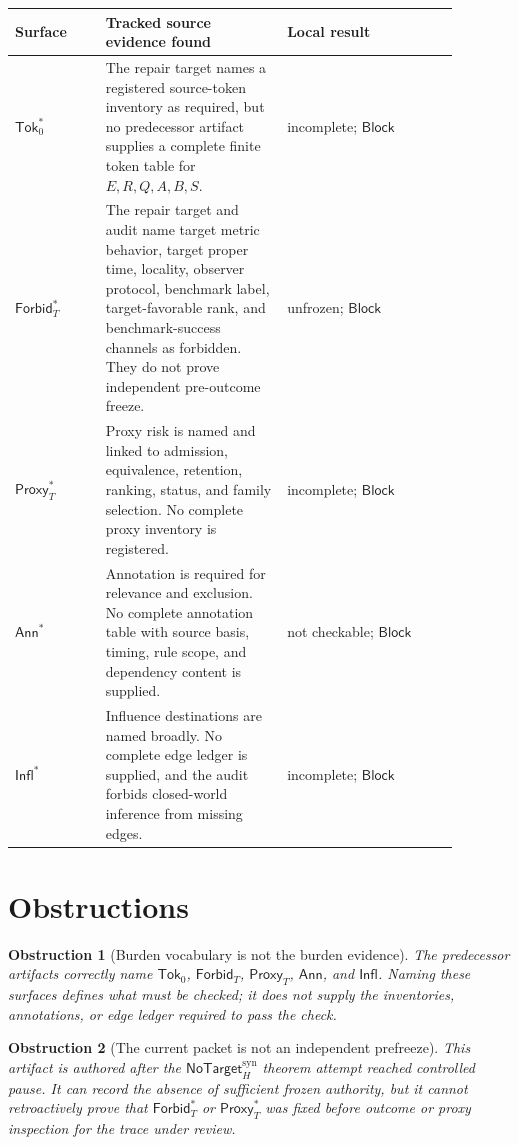 \documentclass[11pt]{article}
\newcommand{\NoTargetSyn}{\mathsf{NoTarget}_{H}^{\mathrm{syn}}}
\newcommand{\SrcTok}{\mathsf{Tok}_{0}}
\newcommand{\ForbidT}{\mathsf{Forbid}_{T}}
\newcommand{\ProxyT}{\mathsf{Proxy}_{T}}
\newcommand{\Annot}{\mathsf{Ann}}
\newcommand{\Influence}{\mathsf{Infl}}
\newcommand{\Block}{\mathsf{Block}}
\newtheorem{obstruction}{Obstruction}
\begin{document}
\begin{center}
\begin{tabular}{p{0.18\linewidth}p{0.36\linewidth}p{0.34\linewidth}}
\textbf{Surface} & \textbf{Tracked source evidence found} & \textbf{Local result} \\
\hline
\(\SrcTok^{*}\) & The repair target names a registered source-token inventory as required, but no predecessor artifact supplies a complete finite token table for \(E,R,Q,A,B,S\). & incomplete; \(\Block\) \\
\(\ForbidT^{*}\) & The repair target and audit name target metric behavior, target proper time, locality, observer protocol, benchmark label, target-favorable rank, and benchmark-success channels as forbidden. They do not prove independent pre-outcome freeze. & unfrozen; \(\Block\) \\
\(\ProxyT^{*}\) & Proxy risk is named and linked to admission, equivalence, retention, ranking, status, and family selection. No complete proxy inventory is registered. & incomplete; \(\Block\) \\
\(\Annot^{*}\) & Annotation is required for relevance and exclusion. No complete annotation table with source basis, timing, rule scope, and dependency content is supplied. & not checkable; \(\Block\) \\
\(\Influence^{*}\) & Influence destinations are named broadly. No complete edge ledger is supplied, and the audit forbids closed-world inference from missing edges. & incomplete; \(\Block\) \\
\end{tabular}
\end{center}

\section{Obstructions}

\begin{obstruction}[Burden vocabulary is not the burden evidence]
The predecessor artifacts correctly name \(\SrcTok\), \(\ForbidT\),
\(\ProxyT\), \(\Annot\), and \(\Influence\). Naming these surfaces defines
what must be checked; it does not supply the inventories, annotations, or
edge ledger required to pass the check.
\end{obstruction}

\begin{obstruction}[The current packet is not an independent prefreeze]
This artifact is authored after the \(\NoTargetSyn\) theorem attempt reached
controlled pause. It can record the absence of sufficient frozen authority,
but it cannot retroactively prove that \(\ForbidT^{*}\) or \(\ProxyT^{*}\)
was fixed before outcome or proxy inspection for the trace under review.
\end{obstruction}
\end{document}
